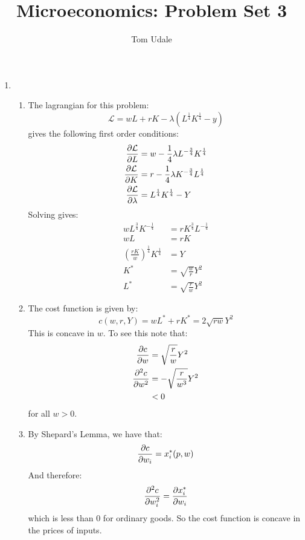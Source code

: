 \documentclass{article}
\title{Microeconomics: Problem Set 3}
\author{Tom Udale}
\newcommand{\Lagr}{\mathcal{L}}
\begin{document}
    \maketitle

    \begin{enumerate}
        \item \begin{enumerate}
            \item The lagrangian for this problem:
            $$\Lagr = wL + rK - \lambda(L^\frac{1}{4}K^\frac{1}{4} - y)$$
            gives the following first order conditions:
            \begin{align*}
                \pdv{\Lagr}{L} &= w - \frac{1}{4} \lambda L^{-\frac{3}{4}} K^\frac{1}{4} \\
                \pdv{\Lagr}{K} &= r - \frac{1}{4} \lambda K^{-\frac{3}{4}} L^\frac{1}{4} \\
                \pdv{\Lagr}{\lambda} &= L^\frac{1}{4}K^\frac{1}{4} - Y
            \end{align*}
            Solving gives:
            \begin{align*}
                w L^\frac{3}{4} K^{-\frac{1}{4}} &= r K^\frac{3}{4} L^{-\frac{1}{4}} \\
                w L &= r K \\
                (\frac{rK}{w})^{\frac{1}{4}}K^\frac{1}{4} &= Y \\
                K^* &= \sqrt{\frac{w}{r}}Y^2 \\
                L^* &= \sqrt{\frac{r}{w}}Y^2
            \end{align*}
            \item The cost function is given by:
            $$c(w,r,Y) = wL^* + rK^* =  2\sqrt{rw}Y^2$$
            This is concave in $w$. To see this note that:
            \begin{align*}
                \pdv{c}{w} &= \sqrt{\frac{r}{w}}Y^2\\
                \pdv[order=2]{c}{w} &= -\sqrt{\frac{r}{w^3}}Y^2 \\
                &< 0 
            \end{align*}
            for all $w>0$.
            \item By Shepard's Lemma, we have that:
            $$\pdv{c}{w_i} = x^*_i(p,w)$$
            And therefore:
            $$\pdv[order=2]{c}{w_i} = \pdv{x^*_i}{w_i}$$
            which is less than 0 for ordinary goods. So the cost function is concave in the prices of inputs. 
        \end{enumerate}

\end{enumerate}
\end{document}
